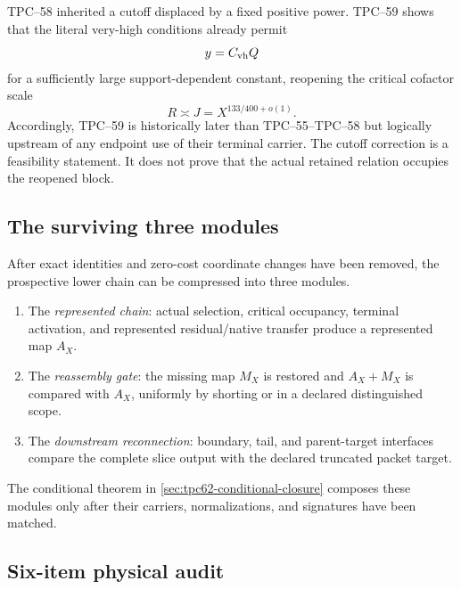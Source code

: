 TPC--58 inherited a cutoff displaced by a fixed positive power.  TPC--59
shows that the literal very-high conditions already permit
\begin{equation}
 y=C_{\rm vh}Q
 \label{eq:tpc62-critical-cutoff}
\end{equation}
for a sufficiently large support-dependent constant, reopening the
critical cofactor scale
\begin{equation}
 R\asymp J=X^{133/400+o(1)}.
 \label{eq:tpc62-critical-cofactor-scale}
\end{equation}
Accordingly, TPC--59 is historically later than TPC--55--TPC--58 but
logically upstream of any endpoint use of their terminal carrier.  The
cutoff correction is a feasibility statement.  It does not prove that the
actual retained relation occupies the reopened block.

\subsection{The surviving three modules}

After exact identities and zero-cost coordinate changes have been removed,
the prospective lower chain can be compressed into three modules.
\begin{enumerate}[label=\textbf{Module \Roman*.},leftmargin=4.5em]
 \item The \emph{represented chain}: actual selection, critical occupancy,
       terminal activation, and represented residual/native transfer produce
       a represented map \(A_X\).
 \item The \emph{reassembly gate}: the missing map \(M_X\) is restored and
       \(A_X+M_X\) is compared with \(A_X\), uniformly by shorting or in a
       declared distinguished scope.
 \item The \emph{downstream reconnection}: boundary, tail, and parent-target
       interfaces compare the complete slice output with the declared
       truncated packet target.
\end{enumerate}
The conditional theorem in \cref{sec:tpc62-conditional-closure} composes
these modules only after their carriers, normalizations, and signatures have
been matched.

\subsection{Six-item physical audit}

